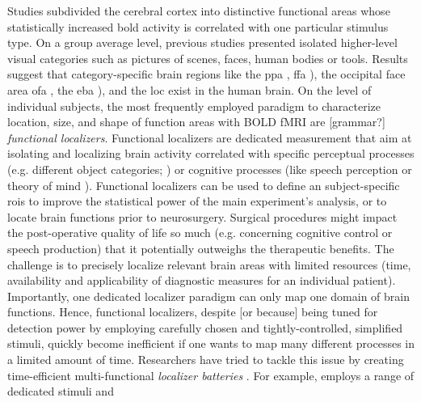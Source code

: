 Studies subdivided the cerebral cortex into distinctive functional areas whose
statistically increased \ac{bold} activity is correlated with one particular
stimulus type.
On a group average level, previous studies presented isolated higher-level
visual categories such as pictures of scenes, faces, human bodies or tools.
Results suggest that category-specific brain regions like the \ac{ppa}
\citep{epstein1998ppa}, \ac{ffa} \citep{kanwisher1997ffa}), the occipital face
area \ac{ofa} \citep{pitcher2011occipitalfacearea}, the \ac{eba}
\citep{downing2001bodyarea}), and the \ac{loc} \citet{malach1995loc} exist in
the human brain.
On the level of individual subjects, the most frequently employed paradigm to
characterize location, size, and shape of function areas with BOLD fMRI are
[grammar?] \textit{functional localizers}.
Functional localizers are dedicated measurement that aim at isolating and
localizing brain activity correlated with specific perceptual processes (e.g.
different object categories; \citet{kanwisher1997ffa}) or cognitive processes
(like speech perception \citet{fernandez2001language} or theory of mind
\citet{spunt2014validating}).
Functional localizers can be used to define an subject-specific \acp{roi} to
improve the statistical power of the main experiment's analysis, or to locate
brain functions prior to neurosurgery.
Surgical procedures might impact the post-operative quality of life so much
(e.g. concerning cognitive control or speech production) that it potentially
outweighs the therapeutic benefits.
The challenge is to precisely localize relevant brain areas with limited
resources (time, availability and applicability of diagnostic measures for an
individual patient).
Importantly, one dedicated localizer paradigm can only map one domain of brain
functions.
Hence, functional localizers, despite [or because] being tuned for detection
power by employing carefully chosen and tightly-controlled, simplified stimuli,
quickly become inefficient if one wants to map many different processes in a
limited amount of time.
Researchers have tried to tackle this issue by creating time-efficient
multi-functional \textit{localizer batteries} \citep{barch2013function,
drobyshevsky2006rapid, pinel2007fast}.
For example, \citet{pinel2007fast} employs a range of dedicated stimuli and
